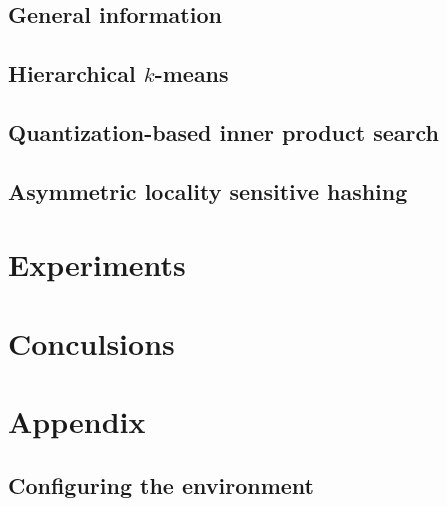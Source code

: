 \documentclass[english,bachelor,a4paper,twoside,11pt]{ppfcmthesis}
\begin{document}
	\section{General information}
	
	\section{Hierarchical $k$-means}
	
	\section{Quantization-based inner product search}
	
	\section{Asymmetric locality sensitive hashing}
	
\chapter{Experiments}
	
\chapter{Conculsions}
	


\newpage
\chapter{Appendix}
\section{Configuring the environment}
	

\ppcolophon
\end{document}
